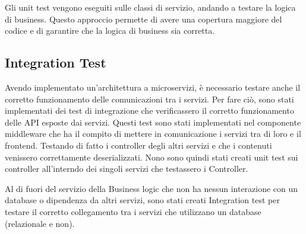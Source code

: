 Gli unit test vengono eseguiti sulle classi di servizio, andando a testare la logica di business. Questo approccio permette di avere una copertura maggiore del codice e di garantire che la logica di business sia corretta.

\subsection{Integration Test}

Avendo implementato un'architettura a microservizi, è necessario testare anche il corretto funzionamento delle comunicazioni tra i servizi. Per fare ciò, sono stati implementati dei test di integrazione che verificassero il corretto funzionamento delle API esposte dai servizi. 
Questi test sono stati implementati nel componente middleware che ha il compito di mettere in comunicazione i servizi tra di loro e il frontend. 
Testando di fatto i controller degli altri servizi e che i contenuti venissero correttamente deserializzati. Nono sono quindi stati creati unit test sui controller all'interndo dei singoli servizi che testassero i Controller.

Al di fuori del servizio della Business logic che non ha nessun interazione con un database o dipendenza da altri servizi, sono stati creati Integration test per testare il corretto collegamento tra i servizi che utilizzano un database (relazionale e non).

